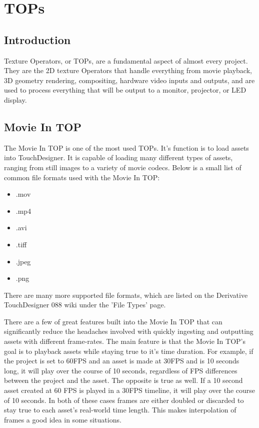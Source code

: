 \cleardoublepage
\chapter{TOPs}
\label{ch:3}


\section{Introduction}

\begin{fullwidth}
Texture Operators, or TOPs, are a fundamental aspect of almost every project. They are the 2D texture Operators that handle everything from movie playback, 3D geometry rendering, compositing, hardware video inputs and outputs, and are used to process everything that will be output to a monitor, projector, or LED display.
\end{fullwidth}


\section{Movie In TOP}

\begin{fullwidth}
The Movie In TOP is one of the most used TOPs. It's function is to load assets into TouchDesigner. It is capable of loading many different types of assets, ranging from still images to a variety of movie codecs. Below is a small list of common file formats used with the Movie In TOP:

\begin{itemize}
\item .mov
\item .mp4
\item .avi
\item .tiff
\item .jpeg
\item .png
\end{itemize}

There are many more supported file formats, which are listed on the Derivative TouchDesigner 088 wiki under the 'File Types' page.

There are a few of great features built into the Movie In TOP that can significantly reduce the headaches involved with quickly ingesting and outputting assets with different frame-rates. The main feature is that the Movie In TOP's goal is to playback assets while staying true to it's time duration. For example, if the project is set to 60FPS and an asset is made at 30FPS and is 10 seconds long, it will play over the course of 10 seconds, regardless of FPS differences between the project and the asset. The opposite is true as well. If a 10 second asset created at 60 FPS is played in a 30FPS timeline, it will play over the course of 10 seconds. In both of these cases frames are either doubled or discarded to stay true to each asset's real-world time length. This makes interpolation of frames a good idea in some situations.

\end{fullwidth}

